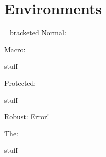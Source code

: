 \documentclass{article}
\begin{document}
\section{Environments}
\newenvironment{bracketed}{[}{]\par}
\newtoks\mytestname
\mytestname={bracketed}
\def\testname{bracketed}
\protected\def\ptestname{bracketed}
\DeclareRobustCommand{\Ptestname}{bracketed}
Normal: \begin{bracketed}stuff\end{bracketed}
Macro: \begin{\testname}stuff\end{\testname}
Protected: \begin{\ptestname}stuff\end{\ptestname}
Robust: Error!\par
The: \begin{\the\mytestname}stuff\end{\the\mytestname}
\end{document}
